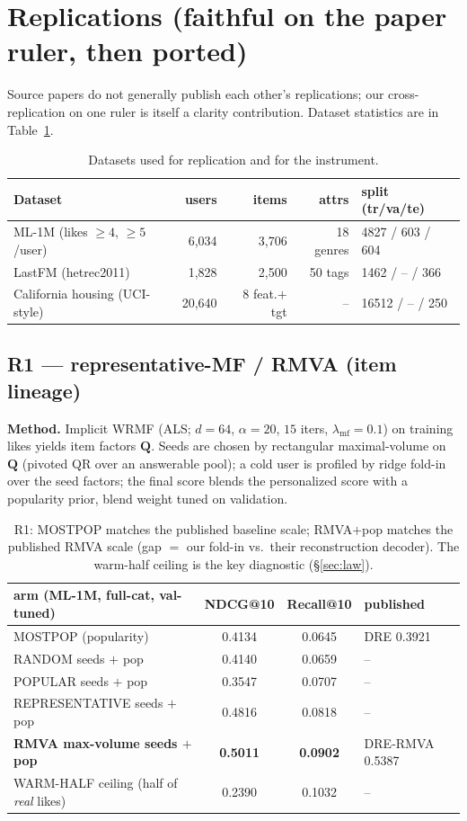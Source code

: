\documentclass[11pt]{article}
\newcommand{\Q}{\mathbf{Q}}
\begin{document}
\section{Replications (faithful on the paper ruler, then ported)}\label{sec:repl}
Source papers do not generally publish each other's replications; our cross-replication on one ruler is itself a
clarity contribution. Dataset statistics are in Table~\ref{tab:data}.

\begin{table}[h]\centering\small
\begin{tabular}{lrrrl}
\toprule
Dataset & users & items & attrs & split (tr/va/te)\\
\midrule
ML-1M (likes $\ge4$, $\ge5$/user) & 6{,}034 & 3{,}706 & 18 genres & 4827 / 603 / 604\\
LastFM (hetrec2011) & 1{,}828 & 2{,}500 & 50 tags & 1462 / -- / 366\\
California housing (UCI-style) & 20{,}640 & 8 feat.$+$tgt & -- & 16512 / -- / 250\\
\bottomrule
\end{tabular}
\caption{Datasets used for replication and for the instrument.}
\label{tab:data}
\end{table}

\subsection{R1 --- representative-MF / RMVA (item lineage)}
\textbf{Method.} Implicit WRMF (ALS; $d{=}64$, $\alpha{=}20$, $15$ iters, $\lambda_{\mathrm{mf}}{=}0.1$) on
training likes yields item factors $\Q$. Seeds are chosen by rectangular maximal-volume on $\Q$ (pivoted QR over
an answerable pool); a cold user is profiled by ridge fold-in over the seed factors; the final score blends the
personalized score with a popularity prior, blend weight tuned on validation.

\begin{table}[h]\centering\small
\begin{tabular}{lccl}
\toprule
arm (ML-1M, full-cat, val-tuned) & NDCG@10 & Recall@10 & published\\
\midrule
MOSTPOP (popularity) & 0.4134 & 0.0645 & DRE 0.3921\\
RANDOM seeds $+$ pop & 0.4140 & 0.0659 & --\\
POPULAR seeds $+$ pop & 0.3547 & 0.0707 & --\\
REPRESENTATIVE seeds $+$ pop & 0.4816 & 0.0818 & --\\
\textbf{RMVA max-volume seeds $+$ pop} & \textbf{0.5011} & \textbf{0.0902} & DRE-RMVA 0.5387\\
\midrule
WARM-HALF ceiling (half of \emph{real} likes) & 0.2390 & 0.1032 & --\\
\bottomrule
\end{tabular}
\caption{R1: MOSTPOP matches the published baseline scale; RMVA$+$pop matches the published RMVA scale (gap $=$
our fold-in vs.\ their reconstruction decoder). The warm-half ceiling is the key diagnostic (\S\ref{sec:law}).}
\label{tab:r1}
\end{table}
\end{document}
